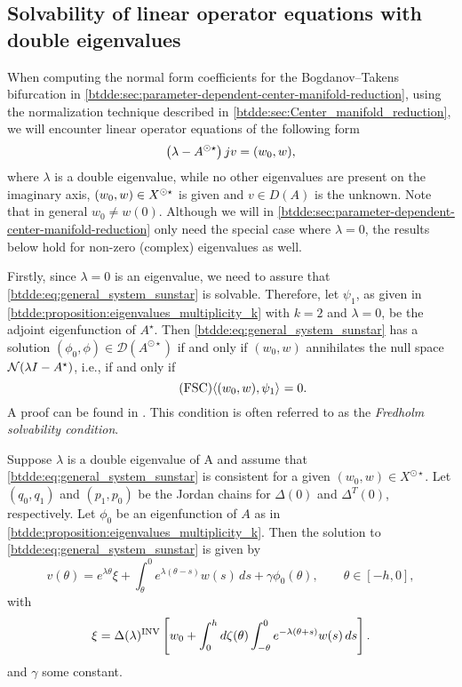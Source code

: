 \subsection{Solvability of linear operator equations with double eigenvalues}
\label{btdde:sec:solvability}

When computing the normal form coefficients for the Bogdanov--Takens
bifurcation in \cref{btdde:sec:parameter-dependent-center-manifold-reduction}, using
the normalization technique described in \cref{btdde:sec:Center_manifold_reduction},
we will encounter linear operator equations of the following form
\begin{equation}
  \label{btdde:eq:general_system_sunstar}
  \left( \lambda - A^{\odot\star} \right)j v = (w_0,w),
\end{equation}
where $\lambda$ is a double eigenvalue, while no other eigenvalues are present
on the imaginary axis, $(w_0,w) \in X^{\odot\star}$ is given and $v \in D(A)$ is
the unknown. Note that in general $w_0 \neq w(0)$. Although we will in
\cref{btdde:sec:parameter-dependent-center-manifold-reduction} only need the special
case where $\lambda = 0$, the results below hold for non-zero (complex)
eigenvalues as well.

Firstly, since $\lambda = 0$ is an eigenvalue, we need to assure that
\cref{btdde:eq:general_system_sunstar} is solvable. Therefore, let $\psi_1$, as given
in \cref{btdde:proposition:eigenvalues_multiplicity_k} with $k=2$ and $\lambda=0$, be
the adjoint eigenfunction of $A^\star$. Then
\cref{btdde:eq:general_system_sunstar} has a solution
$(\phi_{0},\phi)\in\mathcal{D}(A^{\odot\star})$ if and only if $(w_0,w)$
annihilates the null space $\mathcal N(\lambda I-A^{\star})$, i.e., if and only
if 
\begin{equation}\tag{FSC}
  \label{btdde:eq:FSC}
  \langle (w_0,w),\psi_1 \rangle_{} = 0.
\end{equation}
A proof can be found in \cite[Lemma 3.2]{Janssens:Thesis}. This condition is
often referred to as the \emph{Fredholm solvability condition}. 

\begin{proposition}
\label{btdde:prop:solution_double_eig}
Suppose $\lambda$ is a double eigenvalue of A and assume that
\cref{btdde:eq:general_system_sunstar} is consistent for a given $(w_0,w)\in
X^{\odot\star}$. Let $(q_0,q_1)$ and $(p_1,p_0)$ be the Jordan chains for
$\Delta(0)$ and $\Delta^T(0)$, respectively. Let $\phi_0$ be an eigenfunction of
$A$ as in \cref{btdde:proposition:eigenvalues_multiplicity_k}. Then the solution to
\cref{btdde:eq:general_system_sunstar} is given by
\[
v(\theta) = e^{\lambda\theta}\xi +
            \int_{\theta}^{0}e^{\lambda(\theta-s)}w(s)\,ds + 
            \gamma \phi_0(\theta),
            \qquad\theta\in[-h,0],
\]
with
\[
\xi = \Delta(\lambda)^{\mathrm{INV}}\left[
            w_0 + 
            \int_{0}^{h}d\zeta(\theta) 
                \int_{-\theta}^{0}e^{-\lambda (\theta + s)}w(s) \,ds
       \right].
\]
and $\gamma$ some constant. 
\end{proposition}

